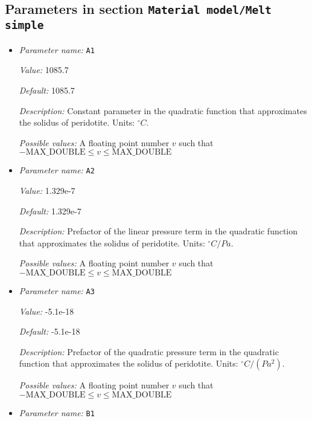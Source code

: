 \subsection{Parameters in section \tt Material model/Melt simple}
\label{parameters:Material_20model/Melt_20simple}

\begin{itemize}
\item {\it Parameter name:} {\tt A1}
\label{parameters:Material model/Melt simple/A1}


{\it Value:} 1085.7


{\it Default:} 1085.7


{\it Description:} Constant parameter in the quadratic function that approximates the solidus of peridotite. Units: ${}^\circ C$.


{\it Possible values:} A floating point number $v$ such that $-\text{MAX\_DOUBLE} \leq v \leq \text{MAX\_DOUBLE}$
\item {\it Parameter name:} {\tt A2}
\label{parameters:Material model/Melt simple/A2}


{\it Value:} 1.329e-7


{\it Default:} 1.329e-7


{\it Description:} Prefactor of the linear pressure term in the quadratic function that approximates the solidus of peridotite. Units: ${}^\circ C/Pa$.


{\it Possible values:} A floating point number $v$ such that $-\text{MAX\_DOUBLE} \leq v \leq \text{MAX\_DOUBLE}$
\item {\it Parameter name:} {\tt A3}
\label{parameters:Material model/Melt simple/A3}


{\it Value:} -5.1e-18


{\it Default:} -5.1e-18


{\it Description:} Prefactor of the quadratic pressure term in the quadratic function that approximates the solidus of peridotite. Units: ${}^\circ C/(Pa^2)$.


{\it Possible values:} A floating point number $v$ such that $-\text{MAX\_DOUBLE} \leq v \leq \text{MAX\_DOUBLE}$
\item {\it Parameter name:} {\tt B1}
\label{parameters:Material model/Melt simple/B1}



\end{itemize}
